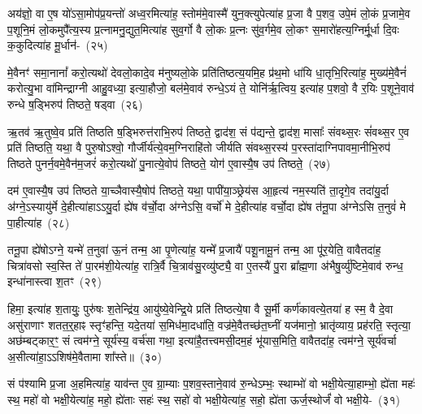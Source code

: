 {\anuvakamend[{भू॒या॒स्त॒ स्व॒स्तये\-ऽग्ने॑ पुष्यासं धृ॒षद्व॑र्ण॒मेका॒न्न\-त्रि॒ꣳ॒शच्च॑}]}%

अय॑ज्ञो॒ वा ए॒ष यो॑\-ऽसा॒मोप॑प्र॒यन्तो॑ अध्व॒रमित्या॑ह॒ स्तोम॑मे॒वास्मै॑ युन॒क्त्युपेत्या॑ह प्र॒जा वै प॒शव॒ उपे॒मं लो॒कं प्र॒जामे॒व प॒शूनि॒मं लो॒कमुपै᳚त्य॒स्य प्र॒त्नामनु॒द्युत॒मित्या॑ह सुव॒र्गो वै लो॒कः प्र॒त्नः सु॑व॒र्गमे॒व लो॒कꣳ स॒मारो॑हत्य॒ग्निर्मू॒र्धा दि॒वः क॒कुदित्या॑ह मू॒र्धान॑-~(२५)

मे॒वैनꣳ॑ समा॒नानां᳚ करो॒त्यथो॑ देवलो॒कादे॒व म॑नुष्यलो॒के प्रति॑तिष्ठत्य॒यमि॒ह प्र॑थ॒मो धा॑यि धा॒तृभि॒रित्या॑ह॒ मुख्य॑मे॒वैनं॑ करोत्यु॒भा वा॑मिन्द्राग्नी आहु॒वध्या॒ इत्या॒हौजो॒ बल॑मे॒वाव॑ रुन्धे॒\-ऽयं ते॒ योनि॑र्\mbox{}ऋ॒त्विय॒ इत्या॑ह प॒शवो॒ वै र॒यिः प॒शूने॒वाव॑ रुन्धे ष॒ड्भिरुप॑ तिष्ठते॒ षड्वा~(२६)

ऋ॒तव॑ ऋ॒तुष्वे॒व प्रति॑ तिष्ठति ष॒ड्भिरुत्त॑राभि॒रुप॑ तिष्ठते॒ द्वाद॑श॒ सं प॑द्यन्ते॒ द्वाद॑श॒ मासाः᳚ संवथ्स॒रः सं॑वथ्स॒र ए॒व प्रति॑ तिष्ठति॒ यथा॒ वै पुरु॒षो\-ऽश्वो॒ गौर्जीर्य॑त्ये॒वम॒ग्निराहि॑तो जीर्यति संवथ्स॒रस्य॑ प॒रस्ता॑दाग्निपावमा॒नीभि॒रुप॑ तिष्ठते पुनर्न॒वमे॒वैन॑म॒जरं॑ करो॒त्यथो॑ पु॒नात्ये॒वोप॑ तिष्ठते॒ योग॑ ए॒वास्यै॒ष उप॑ तिष्ठते॒~(२७)

दम॑ ए॒वास्यै॒ष उप॑ तिष्ठते या॒च्ञैवास्यै॒षोप॑ तिष्ठते॒ यथा॒ पापी॑या॒ञ्छ्रेय॑स आ॒हृत्य॑ नम॒स्यति॑ ता॒दृगे॒व तदा॑यु॒र्दा अ॑ग्ने॒\-ऽस्यायु॑र्मे दे॒हीत्या॑हा\-ऽऽ\-यु॒र्दा ह्ये॑ष व॑र्चो॒दा अ॑ग्ने\-ऽसि॒ वर्चो॑ मे दे॒हीत्या॑ह वर्चो॒दा ह्ये॑ष त॑नू॒पा अ॑ग्ने\-ऽसि त॒नुवं॑ मे पा॒हीत्या॑ह~(२८)

तनू॒पा ह्ये॑षो\-ऽग्ने॒ यन्मे॑ त॒नुवा॑ ऊ॒नं तन्म॒ आ पृ॒णेत्या॑ह॒ यन्मे᳚ प्र॒जायै॑ पशू॒नामू॒नं तन्म॒ आ पू॑र॒येति॒ वावैतदा॑ह॒ चित्रा॑वसो स्व॒स्ति ते॑ पा॒रम॑शी॒येत्या॑ह॒ रात्रि॒र्वै चि॒त्राव॑सु॒रव्यु॑ष्ट्यै॒ वा ए॒तस्यै॑ पु॒रा ब्रा᳚ह्म॒णा अ॑भैषु॒र्व्यु॑ष्टिमे॒वाव॑ रुन्ध॒ इन्धा॑नास्त्वा श॒तꣳ~(२९)

हिमा॒ इत्या॑ह श॒तायुः॒ पुरु॑षः श॒तेन्द्रि॑य॒ आयु॑ष्ये॒वेन्द्रि॒ये प्रति॑ तिष्ठत्ये॒षा वै सू॒र्मी कर्ण॑कावत्ये॒तया॑ ह स्म॒ वै दे॒वा असु॑राणाꣳ शतत॒र्॒\mbox{}हाꣴ स्तृꣳ॑हन्ति॒ यदे॒तया॑ स॒मिध॑मा॒दधा॑ति॒ वज्र॑मे॒वैतच्छ॑त॒घ्नीं यज॑मानो॒ भ्रातृ॑व्याय॒ प्रह॑रति॒ स्तृत्या॒ अछ॑म्बट्कार॒ꣳ॒ सं त्वम॑ग्ने॒ सूर्य॑स्य॒ वर्च॑सा गथा॒ इत्या॑है॒तत्त्वमसी॒दम॒हं भू॑यास॒मिति॒ वावैतदा॑ह॒ त्वम॑ग्ने॒ सूर्य॑वर्चा अ॒सीत्या॑हा॒\-ऽऽ\-शिष॑मे॒वैतामा शा᳚स्ते॥~(३०)

{\anuvakamend[{मू॒र्धानं॒ वै तिष्ठ॑त आह श॒तम॒हꣳ षोड॑श च}]}%

सं प॑श्यामि प्र॒जा अ॒हमित्या॑ह॒ याव॑न्त ए॒व ग्रा॒म्याः प॒शव॒स्ताने॒वाव॑ रु॒न्धे\-ऽम्भः॒ स्थाम्भो॑ वो भक्षी॒येत्या॒हाम्भो॒ ह्ये॑ता महः॑ स्थ॒ महो॑ वो भक्षी॒येत्या॑ह॒ महो॒ ह्ये॑ताः सहः॑ स्थ॒ सहो॑ वो भक्षी॒येत्या॑ह॒ सहो॒ ह्ये॑ता ऊर्ज॒स्थोर्जं॑ वो भक्षी॒ये-~(३१)

